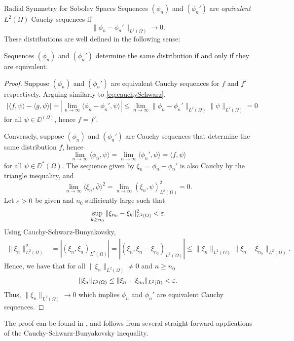 \begin{chapter}{Radial Symmetry for Sobolev Spaces}
Sequences $(\phi_n)$ and $(\phi_n')$ are \emph{equivalent} $L^2(\Omega)$ Cauchy sequences if
\begin{equation}\label{eq:cauchyEquivalence}
  \|\phi_n - \phi_n'\|_{L^2(\Omega)} \to 0.
\end{equation}
These distributions are well defined in the following sense: 
\begin{prop} \label{prop:cauchyCorrespondence}
  Sequences $(\phi_n)$ and $(\phi_n')$ determine the same distribution if and only if they are equivalent.
\end{prop}
\begin{com}
\begin{proof}
  Suppose $(\phi_n)$ and $(\phi_n')$ are equivalent Cauchy sequences for $f$ and $f'$ respectively.
  Arguing similarly to \eqref{eq:cauchySchwarz},
  \begin{align} 
    |\langle f, \psi\rangle - \langle g, \psi\rangle| = \left|\lim_{n\to \infty}\langle \phi_n - \phi_n', \psi\rangle\right| \le \lim_{n\to\infty}\|\phi_n - \phi_n'\|_{L^2(\Omega)}\|\psi\|_{L^2(\Omega)} =  0
  \end{align} 
  for all $\psi \in \DD^(\Omega)$, hence $f = f'$.

  Conversely, suppose $(\phi_n)$ and $(\phi_n')$ are Cauchy sequences that determine the same distribution $f$, hence
  \begin{equation}
    \lim_{n\to\infty} \langle \phi_n,\psi\rangle = \lim_{n\to\infty} \langle \phi_n',\psi\rangle = \langle f,\psi\rangle
  \end{equation}
  for all $\psi \in \DD^*(\Omega)$.
  The sequence given by $\xi_n = \phi_n - \phi_n'$ is also Cauchy by the triangle inequality, and 
  \begin{equation}
    \lim_{n\to\infty}\langle \xi_n,\bar{\psi}\rangle^2 = \lim_{n\to\infty} (\xi_n,\psi)_{L^2(\Omega)}^2 = 0.
  \end{equation}
  Let $\varepsilon >0$ be given and $n_0$ sufficiently large such that 
  \begin{equation}
    \sup_{k\ge n_0} \|\xi_{n_0} - \xi_k\|_{L^2(\Omega)}^2 < \varepsilon.
  \end{equation}
  Using Cauchy-Schwarz-Bunyakovsky,
  \begin{align}
    \|\xi_n\|_{L^2(\Omega)}^2 &= |(\xi_n,\xi_n)_{L^2(\Omega)}| = |(\xi_n,\xi_n - \xi_{n_0})_{L^2(\Omega)}| \le \|\xi_n\|_{L^2(\Omega)}\|\xi_n-\xi_{n_0}\|_{L^2(\Omega)}.
  \end{align}
  Hence, we have that for all $\|\xi_n\|_{L^2(\Omega)} \not= 0$ and $n \ge n_0$
  \begin{equation}
    \|\xi_n\|_{L^2(\Omega)} \le \|\xi_n - \xi_{n_0}\|_{L^2(\Omega)} < \varepsilon.
  \end{equation}
  Thus, $\|\xi_n\|_{L^2(\Omega)} \to 0$ which implies $\phi_n$ and $\phi_n'$ are equivalent Cauchy sequences.
\end{proof}
\end{com}
The proof can be found in \citep{richtmyer1978principles}, and follows from several straight-forward applications of the Cauchy-Schwarz-Bunyakovsky inequality.


\end{chapter}
